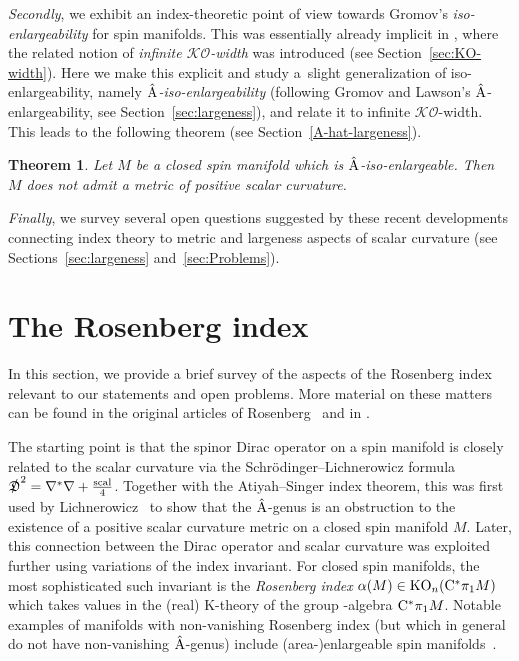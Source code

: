 \documentclass[pdftex]{sigma}
\numberwithin{equation}{section}
\newtheorem{Theorem}{Theorem}[section]
\begin{document}
\emph{Secondly}, we exhibit an index-theoretic point of view towards Gromov's \emph{iso-enlargeability} for spin manifolds.
This was essentially already implicit in \cite{Zeidler:band-width-estimates}, where the related notion of \emph{infinite \(\mathcal{KO}\)-width} was introduced (see Section~\ref{sec:KO-width}).
Here we make this explicit and study a~slight generalization of iso-enlargeability, namely \emph{\(\hat{\mathrm{A}}\)-iso-enlargeability} (following Gromov and Lawson's \(\hat{\mathrm{A}}\)-enlargeability, see Section~\ref{sec:largeness}), and relate it to infinite \(\mathcal{KO}\)-width.
This leads to the following theorem (see Section~\ref{A-hat-largeness}).
\begin{Theorem}\label{thm:A-hat-iso-enlargeable}
 Let \(M\) be a closed spin manifold which is \(\hat{\mathrm{A}}\)-iso-enlargeable.
 Then \(M\) does not admit a metric of positive scalar curvature.
\end{Theorem}

\emph{Finally}, we survey several open questions suggested by these recent developments connecting index theory to metric and largeness aspects of scalar curvature (see Sections~\ref{sec:largeness} and~\ref{sec:Problems}).

\section{The Rosenberg index} \label{sec:Rosenberg-index}
In this section, we provide a brief survey of the aspects of the Rosenberg index relevant to our statements and open problems.
More material on these matters can be found in the original articles of Rosenberg~\cite{Rosenberg:PSCNovikovI,Rosenberg:PSCNovikovII,Rosenberg:PSCNovikovIII} and in \cite{RosenbergStolz:PSCSurgeryConnections,Schick:ICM,Stolz:ManifoldsOfPSC,Stolz98Concordance}.

The starting point is that the spinor Dirac operator on a spin manifold is closely related to the scalar curvature via the Schr\"odinger--Lichnerowicz formula \(\slashed{\mathfrak{D}}^2 = \nabla^\ast \nabla + \frac{\operatorname{scal}}{4}\).
Together with the Atiyah--Singer index theorem, this was first used by Lichnerowicz~\cite{Lichnerwociz:Spineurs} to show that the \(\hat{\mathrm{A}}\)-genus is an obstruction to the existence of a positive scalar curvature metric on a closed spin manifold \(M\).
Later, this connection between the Dirac operator and scalar curvature was exploited further using variations of the index invariant.
For closed spin manifolds, the most sophisticated such invariant is the \emph{Rosenberg index} \(\alpha(M) \in \operatorname{KO}_n(\mathrm{C}^\ast \pi_1 M)\) which takes values in the (real) K-theory of the group \textCstar-algebra \(\mathrm{C}^\ast \pi_1 M\).
Notable examples of manifolds with non-vanishing Rosenberg index (but which in general do not have non-vanishing \(\hat{\mathrm{A}}\)-genus) include (area-)enlargeable spin manifolds~\cite{Hanke-Kotschick-Roe-Schick:Coarse-Top-Enlargeability, HankeSchick:Enlargeable,HankeSchick:EnlargeableInfinite}.
\end{document}
